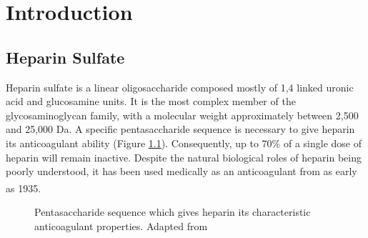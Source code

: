 \chapter{Introduction}
\label{Chapter1}
\section{Heparin Sulfate}
Heparin sulfate is a linear oligosaccharide composed mostly of 1,4 linked uronic acid and glucosamine units. It is the most complex member of the glycosaminoglycan family, with a molecular weight approximately between 2,500 and 25,000 Da.  A specific pentasaccharide sequence is necessary to give heparin its anticoagulant ability (Figure \ref{heparin_pentasaccharide}). Consequently, up to 70\%  of a single dose of heparin will remain inactive. Despite the natural biological roles of heparin being poorly understood, it has been used medically as an anticoagulant from as early as 1935.\textsuperscript{\cite{Bromfield2013HeparinApplications}}
\begin{figure} [ht!]
\caption{Pentasaccharide sequence which gives heparin its characteristic anticoagulant properties. Adapted from \cite{Bromfield2013HeparinApplications,Peterson2009DesignApproach}}
\label{heparin_pentasaccharide}
\end{figure}

